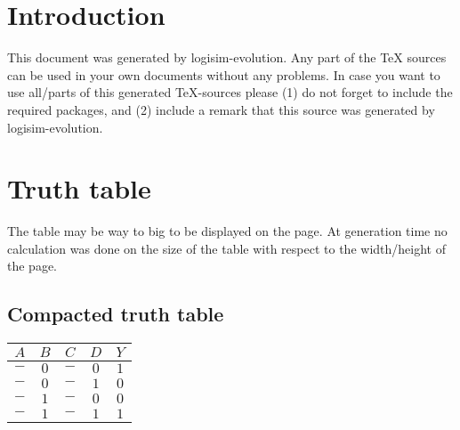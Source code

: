 \documentclass [15pt,a4paper,twoside]{article}
\begin{document}
\section{Introduction}
This document was generated by logisim-evolution. Any part of the TeX sources can be used in your own documents without any problems. In case you want to use all/parts of this generated TeX-sources please (1) do not forget to include the required packages, and (2) include a remark that this source was generated by logisim-evolution.
\section{Truth table}
The table may be way to big to be displayed on the page. At generation time no calculation was done on the size of the table with respect to the width/height of the page.
\subsection{Compacted truth table}
\begin{center}
\begin{tabular}{cccc|c}
$A$&$B$&$C$&$D$&$Y$\\
\hline
$-$&$0$&$-$&$0$&$1$\\
$-$&$0$&$-$&$1$&$0$\\
$-$&$1$&$-$&$0$&$0$\\
$-$&$1$&$-$&$1$&$1$\\

\end{tabular}
\end{center}
\end{document}
